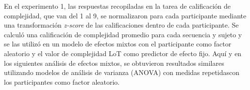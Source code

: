 En el experimento 1, las respuestas recopiladas en la tarea de calificación de complejidad, que van del 1 al 9, se normalizaron para cada participante mediante una transformación \textit{z-score} de las calificaciones dentro de cada participante. Se calculó una calificación de complejidad promedio para cada secuencia y sujeto y se las utilizó en un modelo de efectos mixtos con el participante como factor aleatorio y el valor de complejidad LoT como predictor de efecto fijo. Aquí y en los siguientes análisis de efectos mixtos, se obtuvieron resultados similares utilizando modelos de análisis de varianza (ANOVA) con medidas repetidascon los participantes como factor aleatorio.


